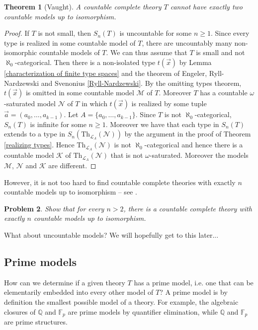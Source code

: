 \documentclass[10pt]{amsart}
\renewcommand{\L}{\mathcal{L}}
\newcommand{\FF}{\mathbb{F}}
\newcommand{\QQ}{\mathbb{Q}}
\newcommand{\MM}{\mathcal{M}}
\newcommand{\NN}{\mathcal{N}}
\newcommand{\KK}{\mathcal{K}}
\newcommand{\Th}{\mathrm{Th}}
\newtheorem{theorem}{Theorem}[subsection]
\newtheorem{problem}[theorem]{Problem}
\theoremstyle{definition}
\theoremstyle{remark}
\begin{document}
\begin{theorem} [Vaught] \label{Vaught's never two theorem} 
A countable complete theory $T$ cannot have exactly two countable models up to isomorphism. 
\end{theorem} 
\begin{proof} 
If $T$ is not small, then $S_n(T)$ is uncountable for some $n\geq 1$. Since every type is realized in some countable model of $T$, there are uncountably many non-isomorphic countable models of $T$. We can thus assume that $T$ is small and not $\aleph_0$-categorical. Then there is a non-isolated type $t(\vec{x})$ by Lemma \ref{characterization of finite type spaces} and the theorem of Engeler, Ryll-Nardzewski and Svenonius \ref{Ryll-Nardzewski}. By the omitting types theorem, $t(\vec{x})$ is omitted in some countable model $\MM$ of $T$. Moreover $T$ has a countable $\omega$-saturated model $\NN$ of $T$ in which $t(\vec{x})$ is realized by some tuple $\vec{a}=(a_0,\dots,a_{k-1})$. Let $A=\{a_0,\dots,a_{k-1}\}$. Since $T$ is not $\aleph_0$-categorical, $S_n(T)$ is infinite for some $n\geq 1$. Moreover we have that each type in $S_n(T)$ extends to a type in $S_n(\Th_{\L_A}(\NN))$ by the argument in the proof of Theorem \ref{realizing types}. Hence $\Th_{\L_A}(\NN)$ is not $\aleph_0$-categorical and hence there is a countable model $\KK$ of $\Th_{\L_A}(\NN)$ that is not $\omega$-saturated. Moreover the models $\MM$, $\NN$ and $\KK$ are different. 
\end{proof} 

However, it is not too hard to find countable complete theories with exactly $n$ countable models up to isomorphism -- see \cite[Exercise 4.3.5]{MR2908005}. 

\begin{problem} 
Show that for every $n>2$, there is a countable complete theory with exactly $n$ countable models up to isomorphism. 
\end{problem} 

What about uncountable models? We will hopefully get to this later... 




\subsection{Prime models} 

How can we determine if a given theory $T$ has a prime model, i.e. one that can be elementarily embedded into every other model of $T$? A prime model is by definition the smallest possible model of a theory. For example, the algebraic closures of $\QQ$ and $\FF_p$ are prime models by quantifier elimination, while $\QQ$ and $\FF_p$ are prime structures. 
\end{document}
